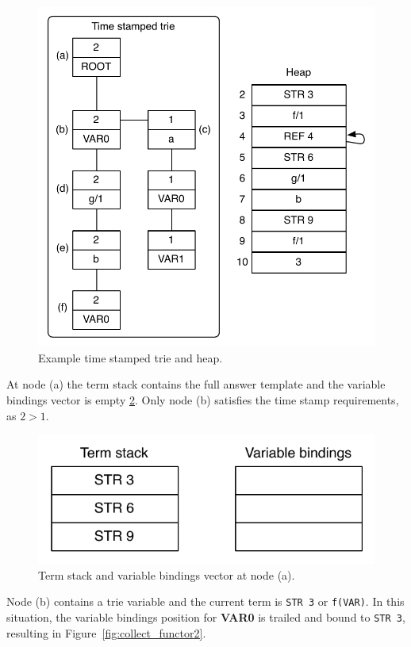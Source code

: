 \begin{figure}[ht]
  \centering
    \includegraphics[scale=0.6]{collect_functor.pdf}
  \caption{Example time stamped trie and heap.}
  \label{fig:collect_functor}
\end{figure}

At node (a) the term stack contains the full answer template and the variable bindings vector
is empty \ref{fig:collect_functor1}. Only node (b) satisfies the time stamp requirements,
as $2 > 1$.

\begin{figure}[H]
  \centering
    \includegraphics[scale=0.5]{collect_functor1.pdf}
  \caption{Term stack and variable bindings vector at node (a).}
  \label{fig:collect_functor1}
\end{figure}

Node (b) contains a trie variable and the current term is \texttt{STR 3} or \texttt{f(VAR)}.
In this situation, the variable bindings position for \textbf{VAR0} is trailed and bound to \texttt{STR 3},
resulting in Figure~\ref{fig:collect_functor2}.

